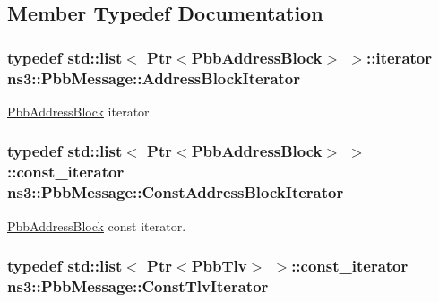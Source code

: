 \subsection{Member Typedef Documentation}
\subsubsection[{\texorpdfstring{Address\+Block\+Iterator}{AddressBlockIterator}}]{\setlength{\rightskip}{0pt plus 5cm}typedef {\bf std\+::list}$<$ {\bf Ptr}$<${\bf Pbb\+Address\+Block}$>$ $>$\+::iterator {\bf ns3\+::\+Pbb\+Message\+::\+Address\+Block\+Iterator}}\hypertarget{classns3_1_1PbbMessage_a9ab666cb1f964e91878353ded8a8f303}{}\label{classns3_1_1PbbMessage_a9ab666cb1f964e91878353ded8a8f303}


\hyperlink{classns3_1_1PbbAddressBlock}{Pbb\+Address\+Block} iterator. 

\subsubsection[{\texorpdfstring{Const\+Address\+Block\+Iterator}{ConstAddressBlockIterator}}]{\setlength{\rightskip}{0pt plus 5cm}typedef {\bf std\+::list}$<$ {\bf Ptr}$<${\bf Pbb\+Address\+Block}$>$ $>$\+::const\+\_\+iterator {\bf ns3\+::\+Pbb\+Message\+::\+Const\+Address\+Block\+Iterator}}\hypertarget{classns3_1_1PbbMessage_ac6e5429e1135918dd1791a4b92a09a56}{}\label{classns3_1_1PbbMessage_ac6e5429e1135918dd1791a4b92a09a56}


\hyperlink{classns3_1_1PbbAddressBlock}{Pbb\+Address\+Block} const iterator. 

\subsubsection[{\texorpdfstring{Const\+Tlv\+Iterator}{ConstTlvIterator}}]{\setlength{\rightskip}{0pt plus 5cm}typedef {\bf std\+::list}$<$ {\bf Ptr}$<${\bf Pbb\+Tlv}$>$ $>$\+::const\+\_\+iterator {\bf ns3\+::\+Pbb\+Message\+::\+Const\+Tlv\+Iterator}}\hypertarget{classns3_1_1PbbMessage_a61799e261fbd64220103731f0cc07594}{}\label{classns3_1_1PbbMessage_a61799e261fbd64220103731f0cc07594}


